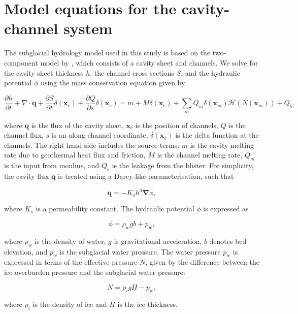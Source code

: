 \documentclass[draft]{agujournal2019}
\newcommand{\Grad}{\boldsymbol{\nabla}}
\newcommand{\pdiff}[2]{\frac{\partial{#1}}{\partial{#2}}}
\begin{document}
\appendix
\section{Model equations for the cavity-channel system}\label{apdx:subglacial_hydrology}
The subglacial hydrology model used in this study is based on the two-component model by , which consists of a cavity sheet and channels. We solve for the cavity sheet thickness $h$, the channel cross sections $S$, and the hydraulic potential $\phi$ using the mass conservation equation given by
\begin{linenomath*}
\begin{equation}\label{eq:mass_conservation_cavity}
    \pdiff{h}{t} + \nabla \cdot \boldsymbol{q} + \pdiff{S}{t} \delta(\boldsymbol{x}_c) +\pdiff{Q}{s} \delta(\boldsymbol{x}_c) = m + M \delta(\boldsymbol{x}_c) + \sum_{m}Q_m\delta\left(\boldsymbol{x}_m\right)\mathcal{H}\left(N(\boldsymbol{x}_m)\right) + Q_b,
\end{equation}
\end{linenomath*}
where $\boldsymbol{q}$ is the flux of the cavity sheet, $\boldsymbol{x}_c$ is the position of channels, $Q$ is the channel flux,  $s$ is an along-channel coordinate, $\delta(\boldsymbol{x}_c)$ is the delta function at the channels. The right hand side includes the source terms: $m$ is the cavity melting rate due to geothermal heat flux and friction, $M$ is the channel melting rate, $Q_m$ is the input from moulins, and $Q_b$ is the leakage from the blister. For simplicity, the cavity flux $\boldsymbol{q}$ is treated using a Darcy-like parameterisation, such that
\begin{linenomath*}
\begin{equation}
    \boldsymbol{q}=-K_s h^{3}\Grad\phi,
\end{equation}
\end{linenomath*}
where $K_s$ is a permeability constant. The hydraulic potential $\phi$ is expressed as
\begin{linenomath*}
\begin{equation}
    \phi = \rho_w g b + p_w,
\end{equation}
\end{linenomath*}
where $\rho_w$ is the density of water, $g$ is gravitational acceleration, $b$ denotes bed elevation, and $p_w$ is the subglacial water pressure. The water pressure $p_w$ is expressed in terms of the effective pressure $N$, given by the difference between the ice overburden pressure and the subglacial water pressure:
\begin{linenomath*}
\begin{equation}
    N = \rho_i g H - p_w,
\end{equation}
\end{linenomath*}
where $\rho_i$ is the density of ice and $H$ is the ice thickness.
\end{document}
